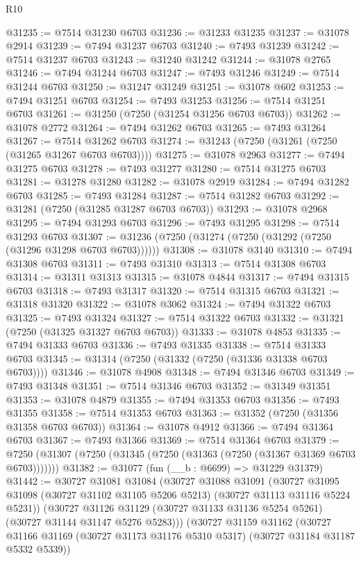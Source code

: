 \begin{lexlean}{R10}
\begin{coremodule}
@31235 := @7514 @31230 @6703
@31236 := @31233 @31235
@31237 := @31078 @2914
@31239 := @7494 @31237 @6703
@31240 := @7493 @31239
@31242 := @7514 @31237 @6703
@31243 := @31240 @31242
@31244 := @31078 @2765
@31246 := @7494 @31244 @6703
@31247 := @7493 @31246
@31249 := @7514 @31244 @6703
@31250 := @31247 @31249
@31251 := @31078 @602
@31253 := @7494 @31251 @6703
@31254 := @7493 @31253
@31256 := @7514 @31251 @6703
@31261 := @31250 (@7250 (@31254 @31256 @6703 @6703))
@31262 := @31078 @2772
@31264 := @7494 @31262 @6703
@31265 := @7493 @31264
@31267 := @7514 @31262 @6703
@31274 := @31243 (@7250 (@31261 (@7250 (@31265 @31267 @6703 @6703))))
@31275 := @31078 @2963
@31277 := @7494 @31275 @6703
@31278 := @7493 @31277
@31280 := @7514 @31275 @6703
@31281 := @31278 @31280
@31282 := @31078 @2919
@31284 := @7494 @31282 @6703
@31285 := @7493 @31284
@31287 := @7514 @31282 @6703
@31292 := @31281 (@7250 (@31285 @31287 @6703 @6703))
@31293 := @31078 @2968
@31295 := @7494 @31293 @6703
@31296 := @7493 @31295
@31298 := @7514 @31293 @6703
@31307 := @31236 (@7250 (@31274 (@7250 (@31292 (@7250 (@31296 @31298 @6703 @6703))))))
@31308 := @31078 @3140
@31310 := @7494 @31308 @6703
@31311 := @7493 @31310
@31313 := @7514 @31308 @6703
@31314 := @31311 @31313
@31315 := @31078 @4844
@31317 := @7494 @31315 @6703
@31318 := @7493 @31317
@31320 := @7514 @31315 @6703
@31321 := @31318 @31320
@31322 := @31078 @3062
@31324 := @7494 @31322 @6703
@31325 := @7493 @31324
@31327 := @7514 @31322 @6703
@31332 := @31321 (@7250 (@31325 @31327 @6703 @6703))
@31333 := @31078 @4853
@31335 := @7494 @31333 @6703
@31336 := @7493 @31335
@31338 := @7514 @31333 @6703
@31345 := @31314 (@7250 (@31332 (@7250 (@31336 @31338 @6703 @6703))))
@31346 := @31078 @4908
@31348 := @7494 @31346 @6703
@31349 := @7493 @31348
@31351 := @7514 @31346 @6703
@31352 := @31349 @31351
@31353 := @31078 @4879
@31355 := @7494 @31353 @6703
@31356 := @7493 @31355
@31358 := @7514 @31353 @6703
@31363 := @31352 (@7250 (@31356 @31358 @6703 @6703))
@31364 := @31078 @4912
@31366 := @7494 @31364 @6703
@31367 := @7493 @31366
@31369 := @7514 @31364 @6703
@31379 := @7250 (@31307 (@7250 (@31345 (@7250 (@31363 (@7250 (@31367 @31369 @6703 @6703)))))))
@31382 := @31077 (fun (__b : @6699) => @31229 @31379)
@31442 := @30727
    @31081
    @31084
    (@30727
      @31088
      @31091
      (@30727 @31095 @31098 (@30727 @31102 @31105 @5206 @5213) (@30727 @31113 @31116 @5224 @5231))
      (@30727 @31126 @31129 (@30727 @31133 @31136 @5254 @5261) (@30727 @31144 @31147 @5276 @5283)))
    (@30727
      @31159
      @31162
      (@30727 @31166 @31169 (@30727 @31173 @31176 @5310 @5317) (@30727 @31184 @31187 @5332 @5339))

\end{coremodule}
\end{lexlean}

